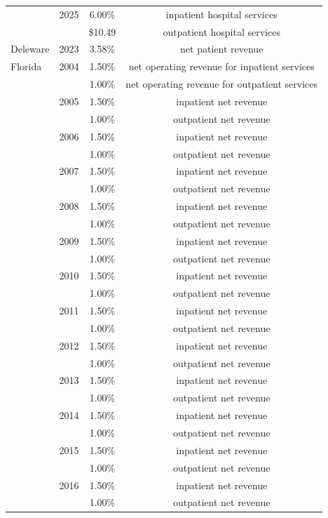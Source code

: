 \begin{longtable}{llcc}
 & 2025 & 6.00\% & inpatient hospital services \\[0pt]
 &  & \$10.49 & outpatient hospital services \\[0pt]
\midrule
Deleware & 2023 & 3.58\% & net patient revenue \\[0pt]
\midrule
Florida & 2004 & 1.50\% & net operating revenue for inpatient services \\[0pt]
 &  & 1.00\% & net operating revenue for outpatient services \\[0pt]
 & 2005 & 1.50\% & inpatient net revenue \\[0pt]
 &  & 1.00\% & outpatient net revenue \\[0pt]
 & 2006 & 1.50\% & inpatient net revenue \\[0pt]
 &  & 1.00\% & outpatient net revenue \\[0pt]
 & 2007 & 1.50\% & inpatient net revenue \\[0pt]
 &  & 1.00\% & outpatient net revenue \\[0pt]
 & 2008 & 1.50\% & inpatient net revenue \\[0pt]
 &  & 1.00\% & outpatient net revenue \\[0pt]
 & 2009 & 1.50\% & inpatient net revenue \\[0pt]
 &  & 1.00\% & outpatient net revenue \\[0pt]
 & 2010 & 1.50\% & inpatient net revenue \\[0pt]
 &  & 1.00\% & outpatient net revenue \\[0pt]
 & 2011 & 1.50\% & inpatient net revenue \\[0pt]
 &  & 1.00\% & outpatient net revenue \\[0pt]
 & 2012 & 1.50\% & inpatient net revenue \\[0pt]
 &  & 1.00\% & outpatient net revenue \\[0pt]
 & 2013 & 1.50\% & inpatient net revenue \\[0pt]
 &  & 1.00\% & outpatient net revenue \\[0pt]
 & 2014 & 1.50\% & inpatient net revenue \\[0pt]
 &  & 1.00\% & outpatient net revenue \\[0pt]
 & 2015 & 1.50\% & inpatient net revenue \\[0pt]
 &  & 1.00\% & outpatient net revenue \\[0pt]
 & 2016 & 1.50\% & inpatient net revenue \\[0pt]
 &  & 1.00\% & outpatient net revenue \\[0pt]

\end{longtable}

